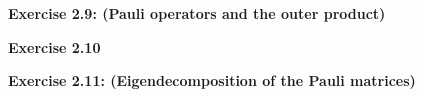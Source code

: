 \documentclass{article}
\begin{document}
\bigskip

\begin{framed}
    \noindent \textbf{Exercise 2.9: (Pauli operators and the outer product)}
    
    \medskip
    
    
\end{framed}

\bigskip

\begin{framed}
    \noindent \textbf{Exercise 2.10}
    
    \medskip
    
    
\end{framed}

\bigskip

\begin{framed}
    \noindent \textbf{Exercise 2.11: (Eigendecomposition of the Pauli matrices)}
    

\end{framed}
\end{document}
